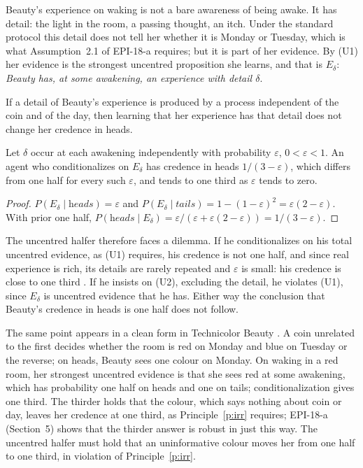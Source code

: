 \documentclass{situationist-preprint}
\begin{document}
Beauty's experience on waking is not a bare awareness of being awake. It has detail: the light in the room, a passing thought, an itch. Under the standard protocol this detail does not tell her whether it is Monday or Tuesday, which is what Assumption~2.1 of EPI-18-a requires; but it is part of her evidence. By (U1) her evidence is the strongest uncentred proposition she learns, and that is $E_\delta$: \emph{Beauty has, at some awakening, an experience with detail $\delta$}.

\begin{principle}[Irrelevance]\label{p:irr}
If a detail of Beauty's experience is produced by a process independent of the coin and of the day, then learning that her experience has that detail does not change her credence in heads.
\end{principle}

\begin{proposition}\label{p:uncentred}
Let $\delta$ occur at each awakening independently with probability $\varepsilon$, $0 < \varepsilon < 1$. An agent who conditionalizes on $E_\delta$ has credence in heads $1/(3-\varepsilon)$, which differs from one half for every such $\varepsilon$, and tends to one third as $\varepsilon$ tends to zero.
\end{proposition}

\begin{proof}
$P(E_\delta \mid \textit{heads}) = \varepsilon$ and $P(E_\delta \mid \textit{tails}) = 1-(1-\varepsilon)^2 = \varepsilon(2-\varepsilon)$. With prior one half, $P(\textit{heads} \mid E_\delta) = \varepsilon/(\varepsilon + \varepsilon(2-\varepsilon)) = 1/(3-\varepsilon)$.
\end{proof}

The uncentred halfer therefore faces a dilemma. If he conditionalizes on his total uncentred evidence, as (U1) requires, his credence is not one half, and since real experience is rich, its details are rarely repeated and $\varepsilon$ is small: his credence is close to one third \citep{Neal2006}. If he insists on (U2), excluding the detail, he violates (U1), since $E_\delta$ is uncentred evidence that he has. Either way the conclusion that Beauty's credence in heads is one half does not follow.

The same point appears in a clean form in Technicolor Beauty \citep{Titelbaum2008}. A coin unrelated to the first decides whether the room is red on Monday and blue on Tuesday or the reverse; on heads, Beauty sees one colour on Monday. On waking in a red room, her strongest uncentred evidence is that she sees red at some awakening, which has probability one half on heads and one on tails; conditionalization gives one third. The thirder holds that the colour, which says nothing about coin or day, leaves her credence at one third, as Principle~\ref{p:irr} requires; EPI-18-a (Section~5) shows that the thirder answer is robust in just this way. The uncentred halfer must hold that an uninformative colour moves her from one half to one third, in violation of Principle~\ref{p:irr}.
\end{document}
